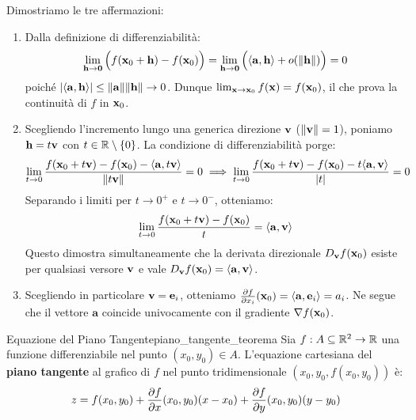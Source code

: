 \begin{dimostrazione}
Dimostriamo le tre affermazioni:
\begin{enumerate}
    \item Dalla definizione di differenziabilità:
    \[
    \lim_{\mathbf{h} \to \mathbf{0}} \Big( f(\mathbf{x}_0 + \mathbf{h}) - f(\mathbf{x}_0) \Big) = \lim_{\mathbf{h} \to \mathbf{0}} \Big( \langle\mathbf{a}, \mathbf{h}\rangle + o(\lVert\mathbf{h}\rVert) \Big) = 0
    \]
    poiché $\lvert\langle\mathbf{a}, \mathbf{h}\rangle\rvert \le \lVert\mathbf{a}\rVert\lVert\mathbf{h}\rVert \to 0$. Dunque $\lim_{\mathbf{x} \to \mathbf{x}_0} f(\mathbf{x}) = f(\mathbf{x}_0)$, il che prova la continuità di $f$ in $\mathbf{x}_0$.
    \item Scegliendo l'incremento lungo una generica direzione $\mathbf{v}$ ($\lVert\mathbf{v}\rVert=1$), poniamo $\mathbf{h} = t\mathbf{v}$ con $t \in \mathbb{R} \setminus \{0\}$. La condizione di differenziabilità porge:
    \[
    \lim_{t \to 0} \frac{f(\mathbf{x}_0 + t\mathbf{v}) - f(\mathbf{x}_0) - \langle\mathbf{a}, t\mathbf{v}\rangle}{\lVert t\mathbf{v}\rVert} = 0 \implies \lim_{t \to 0} \frac{f(\mathbf{x}_0 + t\mathbf{v}) - f(\mathbf{x}_0) - t\langle\mathbf{a}, \mathbf{v}\rangle}{\lvert t\rvert} = 0
    \]
    Separando i limiti per $t \to 0^+$ e $t \to 0^-$, otteniamo:
    \[
    \lim_{t \to 0} \frac{f(\mathbf{x}_0 + t\mathbf{v}) - f(\mathbf{x}_0)}{t} = \langle\mathbf{a}, \mathbf{v}\rangle
    \]
    Questo dimostra simultaneamente che la derivata direzionale $D_{\mathbf{v}} f(\mathbf{x}_0)$ esiste per qualsiasi versore $\mathbf{v}$ e vale $D_{\mathbf{v}} f(\mathbf{x}_0) = \langle\mathbf{a}, \mathbf{v}\rangle$.
    \item Scegliendo in particolare $\mathbf{v} = \mathbf{e}_i$, otteniamo $\frac{\partial f}{\partial x_i}(\mathbf{x}_0) = \langle\mathbf{a}, \mathbf{e}_i\rangle = a_i$. Ne segue che il vettore $\mathbf{a}$ coincide univocamente con il gradiente $\nabla f(\mathbf{x}_0)$.
\end{enumerate}
\end{dimostrazione}

\begin{teorema}{Equazione del Piano Tangente}{piano_tangente_teorema}
Sia $f: A \subseteq \mathbb{R}^2 \to \mathbb{R}$ una funzione differenziabile nel punto $(x_0, y_0) \in A$. L'equazione cartesiana del \textbf{piano tangente} al grafico di $f$ nel punto tridimensionale $(x_0, y_0, f(x_0, y_0))$ è:
\[
z = f(x_0, y_0) + \frac{\partial f}{\partial x}(x_0, y_0)(x - x_0) + \frac{\partial f}{\partial y}(x_0, y_0)(y - y_0)
\]
\end{teorema}

